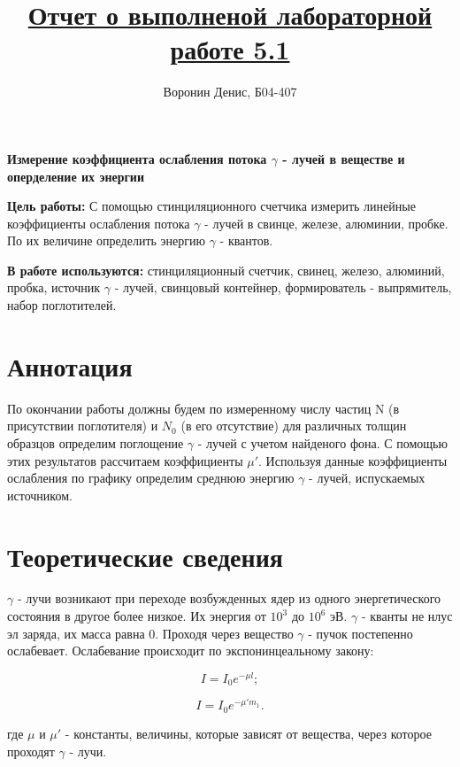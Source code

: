 \documentclass[a4paper]{article}
\title{\underline{Отчет о выполненой лабораторной работе 5.1}}
\author{Воронин Денис, Б04-407}
\begin{document}
\maketitle

\begin{center}
\textbf{\Large Измерение коэффициента ослабления потока $\gamma$ - лучей в веществе и оперделение их энергии}
\end{center}

\textbf{Цель работы:} С помощью стинциляционного счетчика измерить линейные коэффициенты ослабления потока $\gamma$ - лучей в свинце, железе, алюминии, пробке. По их величине определить энергию $\gamma$ - квантов.

\textbf{В работе используются:} стинциляционный счетчик, свинец, железо, алюминий, пробка, источник $\gamma$ - лучей, свинцовый контейнер, формирователь - выпрямитель, набор поглотителей.

\section{Аннотация}

По окончании работы должны будем по измеренному числу частиц N (в присутствии поглотителя) и $N_{0}$ (в его отсутствие) для различных толщин образцов определим поглощение $\gamma$ - лучей с учетом найденого фона. С помощью этих результатов рассчитаем коэффициенты $\mu '$. Используя данные коэффициенты ослабления по графику определим среднюю энергию $\gamma$ - лучей, испускаемых источником.

\section{Теоретические сведения}

$\gamma$ - лучи возникают при переходе возбужденных ядер из одного энергетического состояния в другое более низкое.
Их энергия от $10^{3}$ до $10^{6}$ эВ. $\gamma$ - кванты не нлус эл заряда, их масса равна 0. Проходя через вещество $\gamma$ - пучок постепенно ослабевает. Ослабевание происходит по экспонинцеальному закону:

\[
I = I_0 e^{-\mu l}; \tag{1}
\]

\[
I = I_0 e^{-\mu' m_1}. \tag{2}
\]

где $\mu$ и $\mu '$ - константы, величины, которые зависят от вещества, через которое проходят $\gamma$ - лучи. \par
\end{document}
